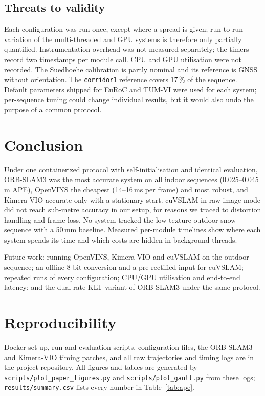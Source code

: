 \documentclass[conference,a4paper]{IEEEtran}
\newcommand{\ds}[1]{\texttt{#1}}
\newcommand{\corr}{\ds{corridor1}}
\newcommand{\sued}{Suedhoehe}
\begin{document}
\subsection{Threats to validity}

Each configuration was run once, except where a spread is given; run-to-run variation of the
multi-threaded and GPU systems is therefore only partially quantified. Instrumentation overhead
was not measured separately; the timers record two timestamps per module call. CPU and GPU
utilisation were not recorded. The \sued{} calibration is partly nominal and its reference is
GNSS without orientation. The \corr{} reference covers 17\,\% of the sequence. Default
parameters shipped for EuRoC and TUM-VI were used for each system; per-sequence tuning could
change individual results, but it would also undo the purpose of a common protocol.

\section{Conclusion}

Under one containerized protocol with self-initialisation and identical evaluation,
ORB-SLAM3 was the most accurate system on all indoor sequences (0.025--0.045\,m APE), OpenVINS
the cheapest (14--16\,ms per frame) and most robust, and Kimera-VIO accurate only with a
stationary start. cuVSLAM in raw-image mode did not reach sub-metre accuracy in our setup, for
reasons we traced to distortion handling and frame loss. No system tracked the low-texture
outdoor snow sequence with a 50\,mm baseline. Measured per-module timelines show where each
system spends its time and which costs are hidden in background threads.

Future work: running OpenVINS, Kimera-VIO and cuVSLAM on the outdoor sequence; an offline
8-bit conversion and a pre-rectified input for cuVSLAM; repeated runs of every configuration;
CPU/GPU utilisation and end-to-end latency; and the dual-rate KLT variant of ORB-SLAM3 under
the same protocol.

\section*{Reproducibility}
Docker set-up, run and evaluation scripts, configuration files, the ORB-SLAM3 and Kimera-VIO
timing patches, and all raw trajectories and timing logs are in the project repository. All
figures and tables are generated by \texttt{scripts/plot\_paper\_figures.py} and
\texttt{scripts/plot\_gantt.py} from these logs; \texttt{results/summary.csv} lists every
number in Table~\ref{tab:ape}.
\end{document}
